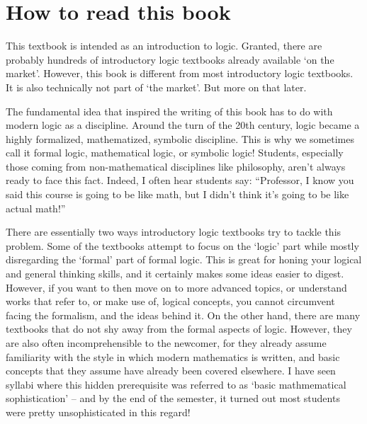 

\chapter{How to read this book}

This textbook is intended as an introduction to logic. Granted, there are probably hundreds of introductory logic textbooks already available `on the market'.  However, this book is different from most introductory logic textbooks. It is also technically not part of `the market'. But more on that later.

The fundamental idea that inspired the writing of this book has to do with modern logic as a discipline. Around the turn of the 20th century, logic became a highly formalized, mathematized, symbolic discipline. This is why we sometimes call it formal logic, mathematical logic, or symbolic logic! Students, especially those coming from non-mathematical disciplines like philosophy, aren't always ready to face this fact. Indeed, I often hear students say: ``Professor, I know you said this course is going to be like math, but I didn't think it's going to be like actual math!'' 

There are essentially two ways introductory logic textbooks try to tackle this problem. Some of the textbooks attempt to focus on the `logic' part while mostly disregarding the `formal' part of formal logic. This is great for honing your logical and general thinking skills, and it certainly makes some ideas easier to digest. However, if you want to then move on to more advanced topics, or understand works that refer to, or make use of, logical concepts, you cannot circumvent facing the formalism, and the ideas behind it. On the other hand, there are many textbooks that do not shy away from the formal aspects of logic. However, they are also often incomprehensible to the newcomer, for they already assume familiarity with the style in which modern mathematics is written, and basic concepts that they assume have already been covered elsewhere. I have seen syllabi where this hidden prerequisite was referred to as `basic mathmematical sophistication' -- and by the end of the semester, it turned out most students were pretty unsophisticated in this regard!

